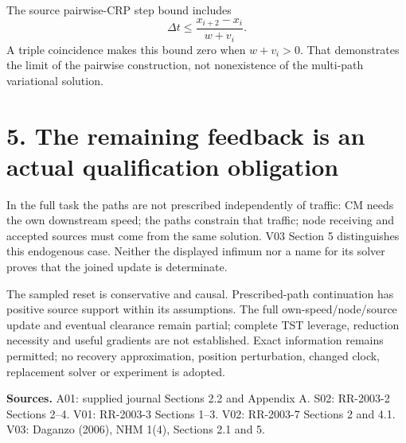 \documentclass[11pt,a4paper]{article}
\begin{document}
The source pairwise-CRP step bound includes
\begin{equation}
 \Delta t\le\frac{x_{i+2}-x_i}{w+v_i}.
\end{equation}
A triple coincidence makes this bound zero when $w+v_i>0$.
That demonstrates the limit of the pairwise construction, not nonexistence
of the multi-path variational solution.

\section*{5. The remaining feedback is an actual qualification obligation}
In the full task the paths are not prescribed independently of traffic:
CM needs the own downstream speed; the paths constrain that traffic; node
receiving and accepted sources must come from the same solution. V03 Section 5
distinguishes this endogenous case. Neither the displayed infimum nor a name
for its solver proves that the joined update is determinate.

The sampled reset is conservative and causal. Prescribed-path continuation has
positive source support within its assumptions. The full own-speed/node/source
update and eventual clearance remain partial; complete TST leverage, reduction
necessity and useful gradients are not established. Exact information remains
permitted; no recovery approximation, position perturbation, changed clock,
replacement solver or experiment is adopted.

\textbf{Sources.} A01: supplied journal Sections 2.2 and Appendix A.
S02: RR-2003-2 Sections 2--4. V01: RR-2003-3 Sections 1--3.
V02: RR-2003-7 Sections 2 and 4.1.
V03: Daganzo (2006), NHM 1(4), Sections 2.1 and 5.
\end{document}
